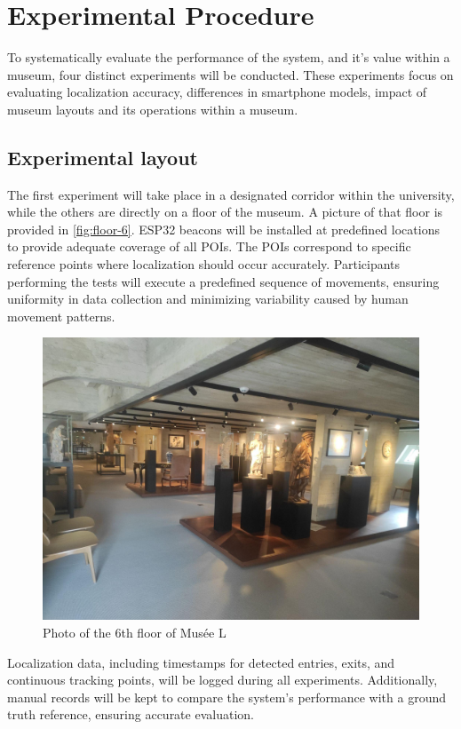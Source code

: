 \section{Experimental Procedure}

To systematically evaluate the performance of the system, and it's value within a museum, four distinct experiments will be conducted. These experiments focus on evaluating localization accuracy, differences in smartphone models, impact of museum layouts and its operations within a museum.

\subsection{Experimental layout}

The first experiment will take place in a designated corridor within the university, while the others are directly on a floor of the museum. A picture of that floor is provided in \autoref{fig:floor-6}. ESP32 beacons will  be installed at predefined locations to provide adequate coverage of all POIs. The POIs correspond to specific reference points where localization should occur accurately. Participants performing the tests will execute a predefined sequence of movements, ensuring uniformity in data collection and minimizing variability caused by human movement patterns.

\begin{figure}
    \centering
    \includegraphics[width=0.75\linewidth]{assets/image-floor.jpg}
		\caption{Photo of the 6th floor of Musée L}
    \label{fig:floor-6}
\end{figure}

Localization data, including timestamps for detected entries, exits, and continuous tracking points, will be logged during all experiments. Additionally, manual records will be kept to compare the system's performance with a ground truth reference, ensuring accurate evaluation.

